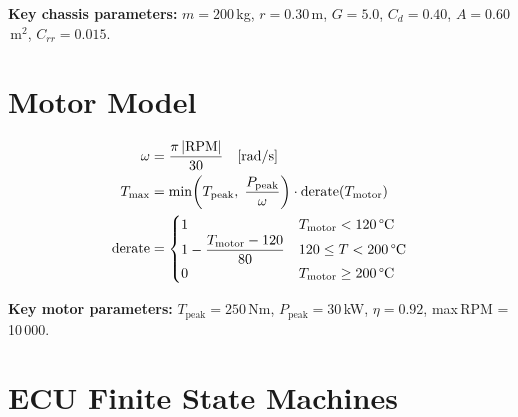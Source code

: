 \documentclass[12pt, a4paper, openany]{report}
\begin{document}
\textbf{Key chassis parameters:} $m = 200$\,kg, $r = 0.30$\,m,
$G = 5.0$, $C_d = 0.40$, $A = 0.60$\,m$^2$, $C_{rr} = 0.015$.

\section{Motor Model}

\begin{align}
  \omega          &= \frac{\pi\,|\text{RPM}|}{30} \quad \text{[rad/s]} \\
  T_\text{max}    &= \min\!\left(T_\text{peak},\; \frac{P_\text{peak}}{\omega}\right)
                     \cdot \text{derate}(T_\text{motor}) \\
  \text{derate}   &= \begin{cases}
                       1 & T_\text{motor} < 120\,\text{\textdegree C} \\
                       1 - \dfrac{T_\text{motor}-120}{80} & 120 \le T < 200\,\text{\textdegree C} \\
                       0 & T_\text{motor} \ge 200\,\text{\textdegree C}
                     \end{cases}
\end{align}

\textbf{Key motor parameters:} $T_\text{peak} = 250$\,Nm,
$P_\text{peak} = 30$\,kW, $\eta = 0.92$, max\,RPM = 10\,000.

\section{ECU Finite State Machines}
\end{document}
